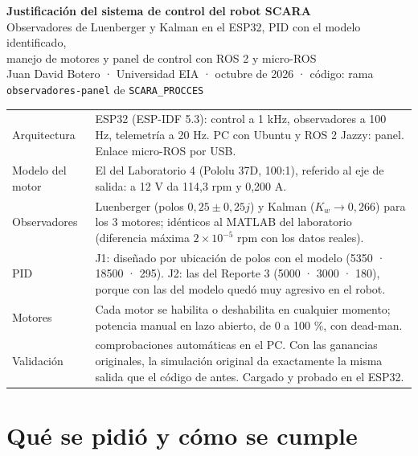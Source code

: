 \documentclass[11pt]{article}
\newcommand{\cod}[1]{\texttt{#1}}
\begin{document}
\begin{center}
{\LARGE\bfseries\color{azul} Justificación del sistema de control del robot SCARA}\\[0.4em]
{\large Observadores de Luenberger y Kalman en el ESP32, PID con el modelo identificado,\\ manejo de motores y panel de control con ROS 2 y micro-ROS}\\[0.6em]
{\small Juan David Botero · Universidad EIA · octubre de 2026 · código: rama \cod{observadores-panel} de \cod{SCARA\_PROCCES}}
\end{center}

\begin{clave}
\small
\begin{tabular}{@{}>{\raggedright\arraybackslash}p{4.3cm}>{\raggedright\arraybackslash}p{11.4cm}@{}}
Arquitectura & ESP32 (ESP-IDF 5.3): control a 1 kHz, observadores a 100 Hz, telemetría a 20 Hz. PC con Ubuntu y ROS 2 Jazzy: panel. Enlace micro-ROS por USB. \\
Modelo del motor & El del Laboratorio 4 (Pololu 37D, 100:1), referido al eje de salida: a 12 V da 114,3 rpm y 0,200 A. \\
Observadores & Luenberger (polos $0{,}25\pm0{,}25j$) y Kalman ($K_w\to0{,}266$) para los 3 motores; idénticos al MATLAB del laboratorio (diferencia máxima $2\times10^{-5}$ rpm con los datos reales). \\
PID & J1: diseñado por ubicación de polos con el modelo (5350 · 18500 · 295). J2: las del Reporte 3 (5000 · 3000 · 180), porque con las del modelo quedó muy agresivo en el robot. \\
Motores & Cada motor se habilita o deshabilita en cualquier momento; potencia manual en lazo abierto, de 0 a 100 \%, con dead-man. \\
Validación & 149 comprobaciones automáticas en el PC. Con las ganancias originales, la simulación original da exactamente la misma salida que el código de antes. Cargado y probado en el ESP32. \\
\end{tabular}
\end{clave}

\section{Qué se pidió y cómo se cumple}
\end{document}
